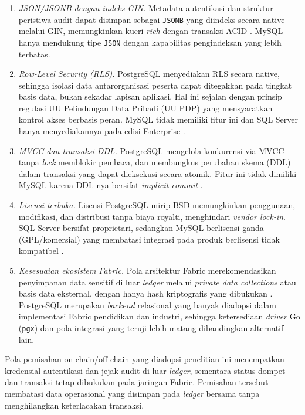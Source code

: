 \begin{enumerate}
    \item \textit{JSON/JSONB dengan indeks GIN.} Metadata autentikasi dan struktur
    peristiwa audit dapat disimpan sebagai \texttt{JSONB} yang diindeks secara
    native melalui GIN, memungkinkan kueri \textit{rich} dengan transaksi ACID
    \cite{postgresql_docs}. MySQL hanya
    mendukung tipe \texttt{JSON} dengan kapabilitas pengindeksan yang lebih
    terbatas.
    \item \textit{Row-Level Security (RLS).} PostgreSQL menyediakan RLS secara
    native, sehingga isolasi data antarorganisasi peserta dapat ditegakkan pada
    tingkat basis data, bukan sekadar lapisan aplikasi. Hal ini sejalan dengan
    prinsip regulasi UU Pelindungan Data Pribadi (UU PDP) yang mensyaratkan
    kontrol akses berbasis peran. MySQL tidak memiliki fitur ini dan SQL Server
    hanya menyediakannya pada edisi Enterprise \cite{postgresql_docs}.
    \item \textit{MVCC dan transaksi DDL.} PostgreSQL mengelola konkurensi
    via MVCC tanpa \textit{lock} memblokir pembaca, dan membungkus perubahan
    skema (DDL) dalam transaksi yang dapat dieksekusi secara atomik. Fitur ini
    tidak dimiliki MySQL karena DDL-nya bersifat \textit{implicit commit}
    \cite{logicmonitor2025pgmysql}.
    \item \textit{Lisensi terbuka.} Lisensi PostgreSQL mirip BSD memungkinkan
    penggunaan, modifikasi, dan distribusi tanpa biaya royalti, menghindari
    \textit{vendor lock-in}. SQL Server bersifat proprietari, sedangkan MySQL
    berlisensi ganda (GPL/komersial) yang membatasi integrasi pada produk
    berlisensi tidak kompatibel \cite{logicmonitor2025pgmysql}.
    \item \textit{Kesesuaian ekosistem Fabric.} Pola arsitektur Fabric
    merekomendasikan penyimpanan data sensitif di luar \textit{ledger} melalui
    \textit{private data collections} atau basis data eksternal, dengan hanya
    hash kriptografis yang dibukukan \cite{hyperledger2024offchain}. PostgreSQL
    merupakan \textit{backend} relasional yang banyak diadopsi dalam
    implementasi Fabric pendidikan dan industri, sehingga ketersediaan
    \textit{driver} Go (\texttt{pgx}) dan pola integrasi yang teruji lebih
    matang dibandingkan alternatif lain.
\end{enumerate}

Pola pemisahan on-chain/off-chain yang diadopsi penelitian ini menempatkan
kredensial autentikasi dan jejak audit di luar \textit{ledger}, sementara status
dompet dan transaksi tetap dibukukan pada jaringan Fabric. Pemisahan tersebut
membatasi data operasional yang disimpan pada \textit{ledger} bersama tanpa
menghilangkan keterlacakan transaksi.

